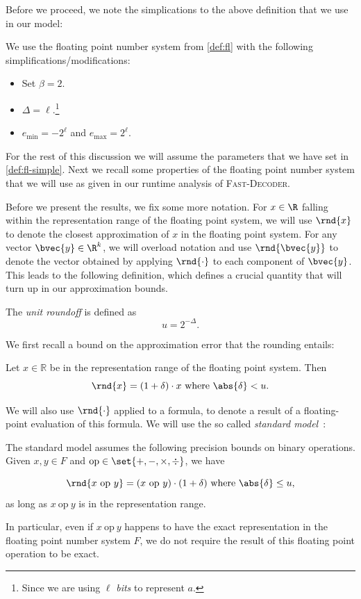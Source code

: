 \documentclass[11pt]{article}
\begin{document}
Before we proceed, we note the simplications to the above definition that we use in our model:
\begin{definition}
    \label{def:fl-simple}
    We use the floating point number system from \cref{def:fl} with the following simplifications/modifications:
    \begin{itemize}
        \item Set $\beta=2$.
        \item $\Delta=\ell$.\footnote{Since we are using $\ell$ {\em bits} to represent $a$.}
        \item $e_{\min}=-2^{\ell}$ and $e_{\max}=2^\ell$.
    \end{itemize}
\end{definition}


For the rest of this discussion we will assume the parameters that we have set in \cref{def:fl-simple}. Next we recall some properties of the floating point number system that we will use as given in our runtime analysis of \textsc{Fast-Decoder}.

Before we present the results, we fix some more notation. For $x\in \R$ falling within the representation range of the floating point system, we will use $\rnd{x}$ to denote the closest approximation of $x$ in the floating point system. For any vector $\bvec{y}\in\R^k$, we will overload notation and use $\rnd{\bvec{y}}$ to denote the vector obtained by applying $\rnd{\cdot}$ to each component of $\bvec{y}$. This leads to the following definition, which defines a crucial quantity that will turn up in our approximation bounds.


\begin{definition}
    \label{def:roundoff}
    The {\em unit roundoff} is defined as
    \[u = 2^{-\Delta}.\]
\end{definition}

We first recall a bound on the approximation error that the rounding entails:
\begin{lemma}
    \label{lem:rounding-error}
    Let $x\in\mathbb{R}$ be in the representation range of the floating point system. Then
    \[\rnd{x}=(1+\delta)\cdot x\text{    where    } \abs{\delta}<u.\]
\end{lemma}

We will also use $\rnd{\cdot}$ applied to a formula, to denote a result of a floating-point evaluation of this formula. We will use the so called {\em standard model}~\cite[Section 2.2]{higham-book}:
\begin{definition}
\label{def:standard-model}
The standard model  assumes the following precision bounds on binary operations.
Given $x,y\in F$ and $\mathrm{op}\in\set{+,-,\times, \div}$, we 
have

\[\rnd{x~\mathrm{op}~y} = (x~\mathrm{op}~y)\cdot (1+\delta) \text{    where    } \abs{\delta}\le u,\]
as long as $x~\mathrm{op}~y$ is in the representation range.
\end{definition}
In particular, even if $x~\mathrm{op}~y$ happens to have the exact representation in the floating point number system $F$, we do not require the result of this floating point operation to be exact.
\end{document}

